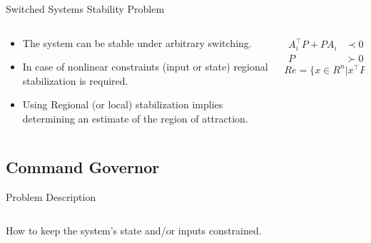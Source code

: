 \begin{slide}{Switched Systems Stability Problem}
  \begin{columns}[c]
    \begin{column}{0.48\textwidth}
      \begin{itemize}
        \item The system can be stable under arbitrary switching.
        \item In case of nonlinear constraints (input or state) regional
              stabilization is required.
        \item Using Regional (or local) stabilization implies determining an
              estimate of the region of attraction.
      \end{itemize}
    \end{column}%
    \hfill%
    \begin{column}{0.48\textwidth}
      \begin{equation}
        \begin{aligned}
          A_{i}^{\top}P+PA_{i} & \prec{} 0 \\
          P                    & \succ 0
        \end{aligned}
      \end{equation}
      \begin{equation}
        Re = \{x\in R^n | x^\top P x \leq c,c>0\}
      \end{equation}
    \end{column}%
  \end{columns}
\end{slide}

\subsection{Command Governor}%
\label{subsec:cg}

\begin{slide}{Problem Description}
  \begin{columns}[c]
    \begin{column}{0.48\textwidth}
      How to keep the system's state and/or inputs constrained.
    \end{column}%
    \hfill%
    \begin{column}{0.48\textwidth}
      
    \end{column}%
  \end{columns}
\end{slide}

